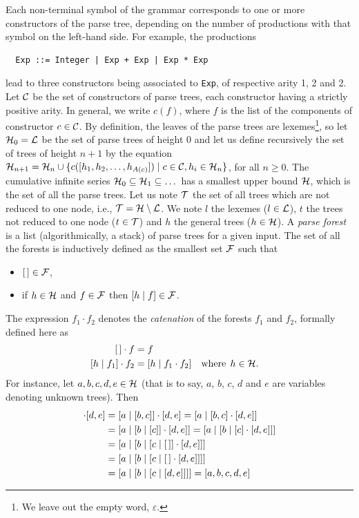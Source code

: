 Each non\hyp{}terminal symbol of the grammar corresponds to one or
more constructors of the parse tree, depending on the number of
productions with that symbol on the left\hyp{}hand side. For example,
the productions
\begin{verbatim}
  Exp ::= Integer | Exp + Exp | Exp * Exp
\end{verbatim}
lead to three constructors being associated to \verb|Exp|, of
respective arity 1, 2 and 2. Let \({\cal C}\) be the set of
constructors of parse trees, each constructor having a strictly
positive arity. In general, we write \(c(f)\), where \(f\) is the list
of the components of constructor \(c \in {\cal C}\). By definition,
the leaves of the parse trees are lexemes\footnote{We leave out the
  empty word, \(\varepsilon\).}, so let \({\cal H}_0 = {\cal L}\) be
the set of parse trees of height \(0\) and let us define recursively
the set of trees of height \(n+1\) by the equation \({\cal H}_{n+1} =
{\cal H}_n \cup \{c([h_1, h_2, \dots, h_{A(c)}]) \mid c \in {\cal C},
h_i \in {\cal H}_n\}\), for all \(n \geqslant 0\). The cumulative
infinite series \({\cal H}_0 \subseteq {\cal H}_1 \subseteq \dots\)
has a smallest upper bound \(\cal H\), which is the set of all the
parse trees. Let us note \(\cal T\) the set of all trees which are not
reduced to one node, i.e., \({\cal T} = {\cal H} \setminus {\cal
  L}\). We note \(l\) the lexemes (\(l \in {\cal L}\)), \(t\) the
trees not reduced to one node (\(t \in {\cal T}\)) and \(h\) the
general trees (\(h \in {\cal H}\)). A \emph{parse forest} is a list
(algorithmically, a stack) of parse trees for a given input. The set
of all the forests is inductively defined as the smallest set \(\cal
F\) such that
\begin{itemize}

  \item \([\,] \in {\cal F}\),

  \item if \(h \in {\cal H}\) and \(f \in {\cal F}\) then
    \([{h}\mid{f}] \in {\cal F}\).

\end{itemize}
The expression \(f_1 \cdot f_2\) denotes the \emph{catenation} of the
forests \(f_1\) and \(f_2\), formally defined here as
\begin{align}
  \el \cdot f &= f \label{model:conc:1}\\
  \cons{h}{f_1} \cdot f_2 &= \cons{h}{f_1 \cdot f_2}
  && \text{where} \;\, h \in {\cal H}. \label{model:conc:2}
\end{align}
For instance, let \(a, b, c, d, e \in {\cal H}\) (that is to say,
\(a\), \(b\), \(c\), \(d\) and \(e\) are variables denoting unknown
trees). Then
\begin{align*}
[a,b,c] \cdot [d,e]
 &= \cons{a}{[b,c]} \cdot [d,e] = \cons{a}{[b,c]
  \cdot [d,e]}\\
 &= \cons{a}{\cons{b}{[c]} \cdot [d,e]} = \cons{a}{\cons{b}{[c] \cdot
    [d,e]}}\\
 &= \cons{a}{\cons{b}{\cons{c}{\el} \cdot [d,e]}}\\
 &= \cons{a}{\cons{b}{\cons{c}{\el \cdot [d,e]}}}\\
 &= \cons{a}{\cons{b}{\cons{c}{[d,e]}}} = [a,b,c,d,e]
\end{align*}

